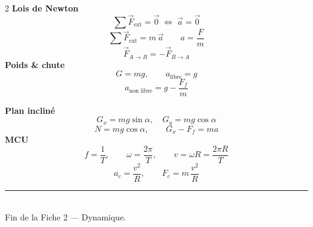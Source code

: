 \documentclass[11pt,a4paper]{article}
\newcommand{\vv}[1]{\vec{#1}}
\begin{document}
\begin{multicols}{2}
\noindent\textbf{Lois de Newton}
\[ \sum\vv F_{\text{ext}}=\vv 0 \;\Leftrightarrow\; \vv a=\vv 0 \]
\[ \sum\vv F_{\text{ext}}=m\,\vv a \qquad a=\frac{F}{m} \]
\[ \vv F_{A\to B}=-\vv F_{B\to A} \]
\textbf{Poids \& chute}
\[ G=mg,\qquad a_{\text{libre}}=g \]
\[ a_{\text{non libre}}=g-\frac{F_f}{m} \]

\columnbreak
\noindent\textbf{Plan incliné}
\[ G_x=mg\sin\alpha,\quad G_y=mg\cos\alpha \]
\[ N=mg\cos\alpha,\qquad G_x-F_f=ma \]
\textbf{MCU}
\[ f=\frac1T,\qquad \omega=\frac{2\pi}{T},\qquad v=\omega R=\frac{2\pi R}{T} \]
\[ a_c=\frac{v^2}{R},\qquad F_c=m\,\frac{v^2}{R} \]
\end{multicols}

\vfill
\begin{center}
\textcolor{primary}{\rule{0.5\textwidth}{1pt}}\\[4pt]
{\small\color{black!60}Fin de la Fiche 2 — Dynamique.}
\end{center}
\end{document}

